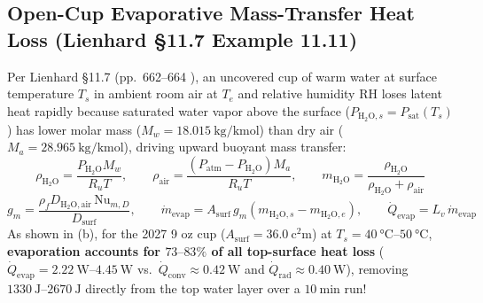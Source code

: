 \subsection{Open-Cup Evaporative Mass-Transfer Heat Loss (Lienhard §11.7 Example 11.11)}
Per Lienhard §11.7 (pp.~662--664 ), an uncovered cup of warm water at surface temperature $T_s$ in ambient room air at $T_e$ and relative humidity $\mathrm{RH}$ loses latent heat rapidly because saturated water vapor above the surface ($P_{\mathrm{H_2O},s} = P_{\mathrm{sat}}(T_s)$) has lower molar mass ($M_w = \SI{18.015}{\kilogram\per\kilo\mole}$) than dry air ($M_a = \SI{28.965}{\kilogram\per\kilo\mole}$), driving upward buoyant mass transfer:
\begin{equation}
  \rho_{\mathrm{H_2O}} = \frac{P_{\mathrm{H_2O}} M_w}{R_u T}, \qquad \rho_{\mathrm{air}} = \frac{(P_{\mathrm{atm}} - P_{\mathrm{H_2O}}) M_a}{R_u T}, \qquad m_{\mathrm{H_2O}} = \frac{\rho_{\mathrm{H_2O}}}{\rho_{\mathrm{H_2O}} + \rho_{\mathrm{air}}}
  \label{eq:11:mass-fraction}
\end{equation}
\begin{equation}
  g_m = \frac{\rho_f D_{\mathrm{H_2O,air}}\,\mathrm{Nu}_{m,D}}{D_{\mathrm{surf}}}, \qquad \dot{m}_{\mathrm{evap}} = A_{\mathrm{surf}}\,g_m\left(m_{\mathrm{H_2O},s} - m_{\mathrm{H_2O},e}\right), \qquad \dot{Q}_{\mathrm{evap}} = L_v\,\dot{m}_{\mathrm{evap}}
  \label{eq:11:qevap-full}
\end{equation}
As shown in (b), for the 2027 9 oz cup ($A_{\mathrm{surf}} = \SI{36.0}{\square\centi\meter}$) at $T_s = \SI{40}{\celsius}$--$\SI{50}{\celsius}$, \textbf{evaporation accounts for $73\text{--}83\%$ of all top-surface heat loss} ($\dot{Q}_{\mathrm{evap}} = \SIrange{2.22}{4.45}{\watt}$ vs.\ $\dot{Q}_{\mathrm{conv}} \approx \SI{0.42}{\watt}$ and $\dot{Q}_{\mathrm{rad}} \approx \SI{0.40}{\watt}$), removing $\SIrange{1330}{2670}{\joule}$ directly from the top water layer over a $\SI{10}{\minute}$ run!

